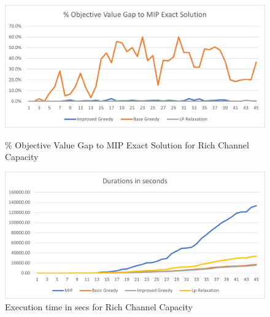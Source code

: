 \documentclass[11pt]{article}
\begin{document}
        \begin{figure}[htb!]
        \centering
        \begin{minipage}{.6\textwidth}
            \centering
            \includegraphics[width=.7\linewidth]{performance_exact_rich.png}
            \caption{\% Objective Value Gap to MIP Exact Solution for Rich Channel Capacity}
            \label{fig:fig_value_gap_exact_rich}
        \end{minipage}%
        \begin{minipage}{.6\textwidth}
            \centering
            \includegraphics[width=.7\linewidth]{durations_exact_rich.png}
            \caption{Execution time in secs for Rich Channel Capacity}
            \label{fig:fig_durations_exact_rich}
        \end{minipage}
        \end{figure}
        
\end{document}
